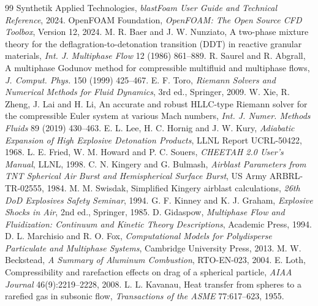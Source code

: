 \documentclass{article}
\begin{document}
\begin{thebibliography}{99}
     Synthetik Applied Technologies, \emph{blastFoam User Guide and Technical Reference}, 2024.
     OpenFOAM Foundation, \emph{OpenFOAM: The Open Source CFD Toolbox}, Version 12, 2024.
     M. R. Baer and J. W. Nunziato, A two-phase mixture theory for the deflagration-to-detonation transition (DDT) in reactive granular materials, \emph{Int. J. Multiphase Flow} 12 (1986) 861--889.
     R. Saurel and R. Abgrall, A multiphase Godunov method for compressible multifluid and multiphase flows, \emph{J. Comput. Phys.} 150 (1999) 425--467.
     E. F. Toro, \emph{Riemann Solvers and Numerical Methods for Fluid Dynamics}, 3rd ed., Springer, 2009.
     W. Xie, R. Zheng, J. Lai and H. Li, An accurate and robust HLLC-type Riemann solver for the compressible Euler system at various Mach numbers, \emph{Int. J. Numer. Methods Fluids} 89 (2019) 430--463.
     E. L. Lee, H. C. Hornig and J. W. Kury, \emph{Adiabatic Expansion of High Explosive Detonation Products}, LLNL Report UCRL-50422, 1968.
     L. E. Fried, W. M. Howard and P. C. Souers, \emph{CHEETAH 2.0 User's Manual}, LLNL, 1998.
     C. N. Kingery and G. Bulmash, \emph{Airblast Parameters from TNT Spherical Air Burst and Hemispherical Surface Burst}, US Army ARBRL-TR-02555, 1984.
     M. M. Swisdak, Simplified Kingery airblast calculations, \emph{26th DoD Explosives Safety Seminar}, 1994.
     G. F. Kinney and K. J. Graham, \emph{Explosive Shocks in Air}, 2nd ed., Springer, 1985.
     D. Gidaspow, \emph{Multiphase Flow and Fluidization: Continuum and Kinetic Theory Descriptions}, Academic Press, 1994.
     D. L. Marchisio and R. O. Fox, \emph{Computational Models for Polydisperse Particulate and Multiphase Systems}, Cambridge University Press, 2013.
     M. W. Beckstead, \emph{A Summary of Aluminum Combustion}, RTO-EN-023, 2004.
     E. Loth, Compressibility and rarefaction effects on drag of a spherical particle, \emph{AIAA Journal} 46(9):2219--2228, 2008.
     L. L. Kavanau, Heat transfer from spheres to a rarefied gas in subsonic flow, \emph{Transactions of the ASME} 77:617--623, 1955.
\end{thebibliography}
\end{document}

